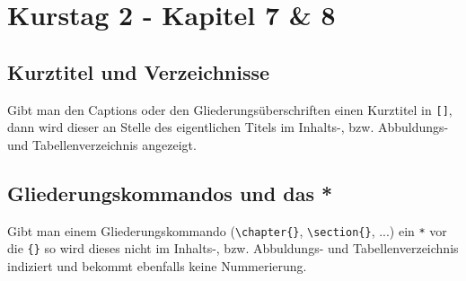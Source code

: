 \documentclass[
12pt,
ngerman
]{scrreprt}
\begin{document}
\chapter[Blatt 4]{Kurstag 2 - Kapitel 7 \& 8}
\label{cha:chap7-8}
\label{blatt:4}

\section{Kurztitel und Verzeichnisse}
\label{sec:kurztitel}
Gibt man den Captions oder den Gliederungsüberschriften einen Kurztitel in \verb![]!, dann wird dieser an Stelle des eigentlichen Titels im Inhalts-, bzw. Abbuldungs- und Tabellenverzeichnis angezeigt.

\section{Gliederungskommandos und das *}
\label{sec:*}
Gibt man einem Gliederungskommando (\verb!\chapter{}!, \verb!\section{}!, ...) ein \verb!*! vor die \verb!{}! so wird dieses nicht im Inhalts-, bzw. Abbuldungs- und Tabellenverzeichnis indiziert und bekommt ebenfalls keine Nummerierung.
\end{document}
